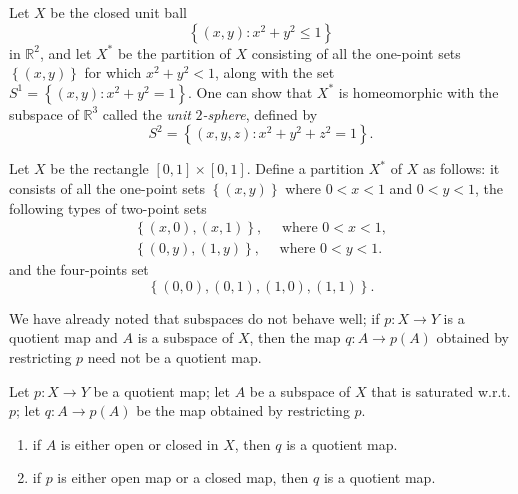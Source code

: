 \begin{example}
  Let \( X \) be the closed unit ball
  \[
    \left\lbrace (x, y): x^2 + y^2 \leq 1 \right\rbrace
  \]
  in \( \mathbb{R}^2 \), and let \( X^* \) be the partition of \( X \) consisting of all the one-point sets \( \left\lbrace (x, y) \right\rbrace \) for which \( x^2 + y^2 < 1 \), along with the set \( S^1 = \left\lbrace (x, y): x^2 + y^2 = 1 \right\rbrace \).
  One can show that \( X^* \) is homeomorphic with the subspace of \( \mathbb{R}^3 \) called the \emph{unit} \( 2 \)\emph{-sphere}, defined by
  \[
    S^2 = \left\lbrace (x, y, z): x^2 + y^2 + z^2 = 1 \right\rbrace.
  \]
\end{example}

\begin{example}
  Let \( X \) be the rectangle \( [0, 1] \times [0, 1] \).
  Define a partition \( X^* \) of \( X \) as follows:
  it consists of all the one-point sets \( \left\lbrace (x, y) \right\rbrace \) where \( 0 < x < 1 \) and \( 0 < y < 1 \), the following types of two-point sets
  \begin{align*}
  \left\lbrace (x, 0), (x, 1) \right\rbrace, \quad \text{ where } 0 < x < 1,\\
  \left\lbrace (0, y), (1, y) \right\rbrace, \quad \text{ where } 0 < y < 1
  .\end{align*}
  and the four-points set
  \[
    \left\lbrace (0, 0), (0, 1), (1, 0), (1, 1) \right\rbrace.
  \]
\end{example}

We have already noted that subspaces do not behave well;
if \( p: X \to Y \) is a quotient map and \( A \) is a subspace of \( X \), then the map \( q: A \to p(A) \) obtained by restricting \( p \) need not be a quotient map.

\begin{theorem}
  Let \( p: X \to Y \) be a quotient map;
  let \( A \) be a subspace of \( X \) that is saturated w.r.t. \( p \);
  let \( q: A \to p(A) \) be the map obtained by restricting \( p \).
  \begin{enumerate}
    \item if \( A \) is either open or closed in \( X \), then \( q \) is a quotient map.
    \item if \( p \) is either open map or a closed map, then \( q \) is a quotient map.
  \end{enumerate}
\end{theorem}

